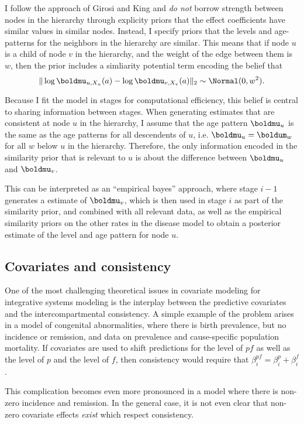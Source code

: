 I follow the approach of Girosi and King and \emph{do not} borrow strength
between nodes in the hierarchy through explicity priors that the effect coefficients
have similar values in similar nodes.  Instead, I specify priors
that the levels and age-patterns for the neighbors in the
hierarchy are similar.  This means that if node
$u$ is a child of node $v$ in the hierarchy, and the weight of the
edge between them is $w$, then the prior includes a simliarity
potential term encoding the belief that
\[
\| \log \boldmu_{u,X_u}(a) - \log \boldmu_{v,X_v}(a)\|_2 \sim \Normal(0, w^2).
\]

Because I fit the model in stages for computational efficiency,
this belief is central to sharing information between stages.  When
generating estimates that are consistent at node $u$
in the hierarchy, I assume that the age pattern $\boldmu_u$ is the
same as the age patterns for all descendents of $u$, i.e. $\boldmu_u =
\boldum_w$ for all $w$ below $u$ in the hierarchy.  Therefore,
the only information encoded in the similarity prior that is relevant
to $u$ is about the difference between $\boldmu_u$ and $\boldmu_v$.

This can be interpreted as an ``empirical bayes'' approach, where
stage $i-1$ generates a estimate of $\boldmu_v$, which is then used in
stage $i$ as part of the similarity prior, and combined with all
relevant data, as well as the empirical similarity priors on the other
rates in the disease model to obtain a posterior estimate of the level
and age pattern for node $u$.

\subsection{Covariates and consistency}
One of the most challenging theoretical issues in covariate modeling
for integrative systems modeling is the interplay between the
predictive covariates and the intercompartmental consistency.  A
simple example of the problem arises in a model of congenital
abnormalities, where there is birth prevalence, but no incidence or
remission, and data on prevalence and cause-specific population
mortality. If covariates are used to shift predictions for the level
of $pf$ as well as the level of $p$ and the level of $f$, then
consistency would require that $\beta^{pf}_i = \beta^p_i + \beta^f_i$.

This complication becomes even more pronounced in a model where there
is non-zero incidence and remission.  In the general case, it is not
even clear that non-zero covariate effects \emph{exist} which respect
consistency.


